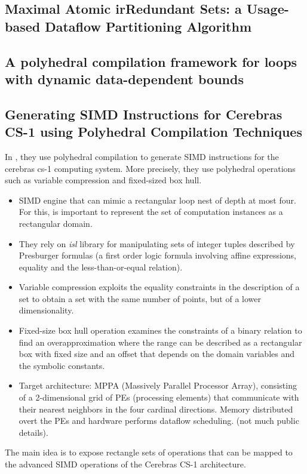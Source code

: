 \subsection{Maximal Atomic irRedundant Sets: a Usage-based Dataflow Partitioning Algorithm}

\subsection{A polyhedral compilation framework for loops with dynamic data-dependent bounds}

\subsection{Generating SIMD Instructions for Cerebras CS-1 using Polyhedral Compilation Techniques}
In \cite{verdoolaege2020generating}, they use polyhedral compilation to generate SIMD instructions for the cerebras cs-1 computing system. More precisely, they use polyhedral operations such as variable compression and fixed-sized box hull.
\begin{itemize}
    \item SIMD engine that can mimic a rectangular loop nest of depth at most four. For this, is important to represent the set of computation instances as a rectangular domain.
    \item They rely on \textit{isl} library for manipulating sets of integer tuples described by Presburger formulas (a first order logic formula involving affine expressions, equality and the less-than-or-equal relation). 
    \item Variable compression exploits the equality constraints in the description of a set to obtain a set with the same number of points, but of a lower dimensionality.
    \item Fixed-size box hull operation examines the constraints of a binary relation to find an overapproximation where the range can be described as a rectangular box with fixed size and an offset that depends on the domain variables and the symbolic constants.
    \item Target architecture: MPPA (Massively Parallel Processor Array), consisting of a 2-dimensional grid of PEs (processing elements) that communicate with their nearest neighbors in the four cardinal directions. Memory distributed overt the PEs and hardware performs dataflow scheduling. (not much public details).
\end{itemize}
The main idea is to expose rectangle sets of operations that can be mapped to the advanced SIMD operations of the Cerebras CS-1 architecture.

